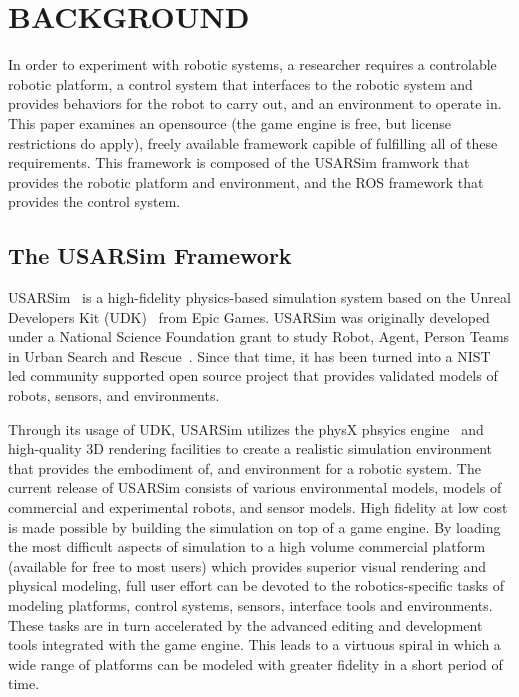 \section*{BACKGROUND}
In order to experiment with robotic systems, a researcher requires a controlable robotic platform, a control system that interfaces to the robotic system and provides behaviors for the robot to carry out, and an environment to operate in.  This paper examines an opensource (the game engine is free, but license restrictions do apply), freely available framework capible of fulfilling all of these requirements. This framework is composed of the USARSim framwork that provides the robotic platform and environment, and the ROS framework that provides the control system.

\subsection*{The USARSim Framework}
USARSim~\cite{CARPIN.LNAI.2006,WANG.WSC.2003} is a high-fidelity physics-based simulation system based on the Unreal Developers Kit (UDK)~\cite{UDKWeb} from Epic Games. USARSim was originally developed under a National Science Foundation grant to study Robot, Agent, Person Teams in Urban Search and Rescue~\cite{LEWIS.ICHC.2003}. Since that time, it has been turned into a NIST led community supported open source project that provides validated models of robots, sensors, and environments.  


Through its usage of UDK, USARSim utilizes the physX phsyics engine~\cite{physXWeb} and high-quality 3D rendering facilities to create a realistic simulation environment that provides the embodiment of, and environment for a robotic
system. The current release of USARSim consists of various environmental models, models of commercial and experimental robots, and sensor models. High fidelity at low cost is made possible by building the simulation on top of a game engine. By loading the most
difficult aspects of simulation to a high volume commercial platform (available for free to most users) which provides superior visual rendering and physical modeling, full user effort can be devoted to the robotics-specific tasks of modeling platforms, control systems, sensors, interface tools and environments. These tasks are in turn accelerated by the advanced editing and development tools integrated with the game engine. This leads to a virtuous spiral in which a wide range of platforms can be modeled with greater fidelity in a short period of time.

